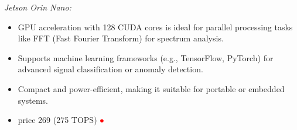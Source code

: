 \documentclass[11pt]{report}
\newcommand{\gc}[1]{\textcolor[rgb]{1.00,0.00,0.00}{#1}}
\newcommand{\blue}[1]{\textcolor[rgb]{0.00,0.00,1.00}{#1}}
\begin{document}
\begin{description}
\textit{Jetson Orin Nano:}
\begin{itemize}
	\item GPU acceleration with 128 CUDA cores is ideal for parallel processing tasks like FFT (Fast Fourier Transform) for spectrum analysis.
	\item Supports machine learning frameworks (e.g., TensorFlow, PyTorch) for advanced signal classification or anomaly detection.
	\item Compact and power-efficient, making it suitable for portable or embedded systems.
	\item price \blue{269} (275 TOPS)
	\href{https://www.ebay.com/itm/168106383528?chn=ps&_trkparms=ispr%3D1&amdata=enc%3A14N27JvSwQ1yvRfmOOkm_6g35&norover=1&mkevt=1&mkrid=21553-241449-2056-0&mkcid=2&itemid=168106383528&targetid=325425753764&device=c&mktype=pla&googleloc=1003657&poi=&campaignid=19731822223&mkgroupid=145954005043&rlsatarget=pla-325425753764&abcId=&merchantid=118870442&gad_source=1&gad_campaignid=19731822223&gbraid=0AAAAAD_QDh9BxICwztO3hAcLrnK_tI8Ph&gclid=Cj0KCQiAp-zLBhDkARIsABcYc6uuNM9AZtXe5GkEXIac95xPHpgWTrb9BtQX0junexJOmRqEXdw8FeYaAgghEALw_wcB}{$\gc{\bullet}$}
\end{itemize}


\end{description}
\end{document}
